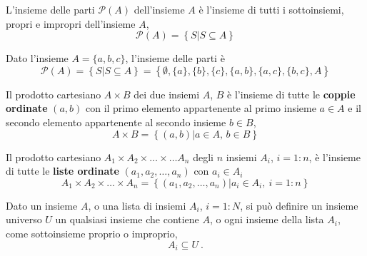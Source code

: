 \begin{definition} L'insieme delle parti $\mathcal{P}(A)$ dell'insieme $A$ è l'insieme di tutti i sottoinsiemi, propri e impropri dell'insieme $A$,
    \begin{equation}
        \mathcal{P}(A) = \left\{ S | S \subseteq A \right\}
    \end{equation}
\end{definition}
\begin{example} Dato l'insieme $A = \{a, b, c \}$, l'insieme delle parti è
    \begin{equation}
        \mathcal{P}(A) = \left\{ S | S \subseteq A \right\} = \left\{ \emptyset, \{a\}, \{b\}, \{c\}, \{a,b\}, \{a,c\}, \{b,c\}, A \right\}
    \end{equation} 
\end{example}

\begin{definition} Il prodotto cartesiano $A \times B$ dei due insiemi $A$, $B$ è l'insieme di tutte le \textbf{coppie ordinate} $(a, b)$ con il primo elemento appartenente al primo insieme $a \in A$ e il secondo elemento appartenente al secondo insieme $b \in B$,
    \begin{equation}
        A \times B = \left\{ (a,b) | a \in A, \, b \in B \right\}
    \end{equation}
\end{definition}
\begin{definition} Il prodotto cartesiano $A_1 \times A_2 \times \dots \times \dots A_n$ degli $n$ insiemi $A_i$, $i = 1:n$, è l'insieme di tutte le \textbf{liste ordinate} $(a_1, a_2, \dots, a_n)$ con $a_i \in A_i$
    \begin{equation}
        A_1 \times A_2 \times \dots \times A_n = \left\{ (a_1, a_2, \dots, a_n) | a_i \in A_i, \ i=1:n \right\}
    \end{equation}
\end{definition}

\begin{definition} Dato un insieme $A$, o una lista di insiemi $A_i$, $i=1:N$, si può definire un insieme universo $U$ un qualsiasi insieme che contiene $A$, o ogni insieme della lista $A_i$, come sottoinsieme proprio o improprio,
    \begin{equation}
        A_i \subseteq U \ .
    \end{equation}
\end{definition}

